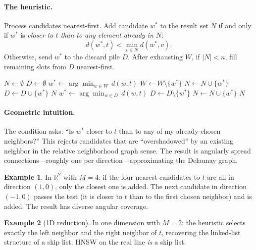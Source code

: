 \documentclass[11pt]{article}
\theoremstyle{definition}
\newtheorem{example}{Example}
\begin{document}
\paragraph{The heuristic.} Process candidates nearest-first. Add candidate $w^*$ to the result set $N$ if and only if $w^*$ is \emph{closer to $t$ than to any element already in $N$}:
\[
  d(w^*, t) < \min_{v \in N} d(w^*, v).
\]
Otherwise, send $w^*$ to the discard pile $D$. After exhausting $W$, if $|N| < n$, fill remaining slots from $D$ nearest-first.

\begin{algorithm}
\caption{\textsc{sel-neighbors} --- heuristic neighbor selection}
\begin{algorithmic}[1]
  \State $N \gets \emptyset$
  \State $D \gets \emptyset$ 
    \State $w^* \gets \arg\min_{w \in W}\, d(w, t)$
    \State $W \gets W \setminus \{w^*\}$
      \State $N \gets N \cup \{w^*\}$
    \Else
      \State $D \gets D \cup \{w^*\}$
    \EndIf
      \State \Return $N$
    \EndIf
  \EndWhile
    \State $w^* \gets \arg\min_{w \in D}\, d(w, t)$
    \State $D \gets D \setminus \{w^*\}$
    \State $N \gets N \cup \{w^*\}$
  \EndWhile
  \State \Return $N$
\EndFunction
\end{algorithmic}
\end{algorithm}

\paragraph{Geometric intuition.} The condition asks: ``Is $w^*$ closer to $t$ than to any of my already-chosen neighbors?'' This rejects candidates that are ``overshadowed'' by an existing neighbor in the relative neighborhood graph sense. The result is angularly spread connections---roughly one per direction---approximating the Delaunay graph.

\begin{example}
  In $\mathbb{R}^2$ with $M = 4$: if the four nearest candidates to $t$ are all in direction $(1, 0)$, only the closest one is added. The next candidate in direction $(-1, 0)$ passes the test (it is closer to $t$ than to the first chosen neighbor) and is added. The result has diverse angular coverage.
\end{example}

\begin{example}[1D reduction]
  In one dimension with $M = 2$: the heuristic selects exactly the left neighbor and the right neighbor of $t$, recovering the linked-list structure of a skip list. HNSW on the real line \emph{is} a skip list.
\end{example}
\end{document}
